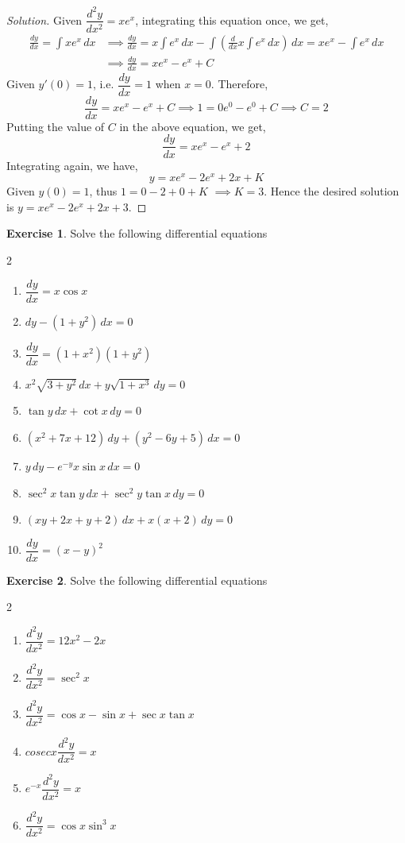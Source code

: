 \documentclass{book}
\theoremstyle{definition}
\newtheorem{exercise}{Exercise}[section]
\newenvironment{solution}
    {\begin{proof}[Solution]}
    {\end{proof}}
\begin{document}
\begin{solution}
Given $\dfrac{d^2y}{dx^2}=xe^x$, integrating this equation once, we get,
\begin{align*}
\frac{dy}{dx}=\int xe^x\,dx &\implies \frac{dy}{dx}=x\int e^x\,dx-\int(\frac{d}{dx}x\int e^x\,dx)\,dx = xe^x-\int e^x\,dx \\    &\implies \frac{dy}{dx} = xe^x-e^x+C
\end{align*}
Given $y'(0)=1$, i.e. $\dfrac{dy}{dx}=1$ when $x=0$. Therefore,
\[
\frac{dy}{dx}=xe^x-e^x+C \implies 1 = 0e^0-e^0+C \implies C=2
\]
Putting the value of $C$ in the above equation, we get,
\[
\frac{dy}{dx}=xe^x-e^x+2
\]
Integrating again, we have, 
\[
y=xe^x-2e^x+2x+K
\]
Given $y(0)=1$, thus $1=0-2+0+K$ $\implies K=3$. Hence the desired solution is $y=xe^x-2e^x+2x+3$. 
\end{solution}
\newpage
\begin{exercise}
Solve the following differential equations 
\begin{multicols}{2}
\begin{enumerate}[label=(\roman*)]
    \item $\dfrac{dy}{dx}=x\cos x$
    \item $dy-(1+y^2)\,dx=0$
    \item $\dfrac{dy}{dx}=(1+x^2)(1+y^2)$
    \item $x^2\sqrt{3+y^2}\,dx+y\sqrt{1+x^3}\,dy=0$
    \item $\tan y\,dx+\cot x\,dy=0$
    \item $(x^2+7x+12)\,dy+(y^2-6y+5)\,dx=0$
    \item $y\,dy-e^{-y}x\sin x\,dx=0$
    \item $\sec^2 x\tan y\,dx+\sec^2y\tan x\,dy=0$
    \item $(xy+2x+y+2)\,dx+x(x+2)\,dy=0$
    \item $\dfrac{dy}{dx}=(x-y)^2$

\end{enumerate}
\end{multicols}
\end{exercise}

\begin{exercise}
Solve the following differential equations 
\begin{multicols}{2}
\begin{enumerate}[label=(\roman*)]
    \item $\dfrac{d^2y}{dx^2}=12x^2-2x$
    \item $\dfrac{d^2y}{dx^2}=\sec^2 x$
    \item $\dfrac{d^2y}{dx^2}=\cos x-\sin x+\sec x\tan x$
    \item $cosec x\dfrac{d^2y}{dx^2}=x$
    \item $e^{-x}\dfrac{d^2y}{dx^2}=x$
    \item $\dfrac{d^2y}{dx^2}=\cos x\sin^3 x$

\end{enumerate}
\end{multicols}
\end{exercise}
\end{document}
